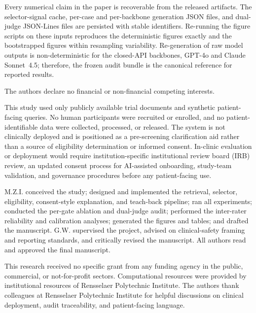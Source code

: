 \documentclass[pdflatex,Numbered]{sn-jnl}
\theoremstyle{plain}
\begin{document}
Every numerical claim in the paper is recoverable from the released artifacts. The selector-signal cache, per-case and per-backbone generation JSON files, and dual-judge JSON-Lines files are persisted with stable identifiers. Re-running the figure scripts on these inputs reproduces the deterministic figures exactly and the bootstrapped figures within resampling variability. Re-generation of raw model outputs is non-deterministic for the closed-API backbones, GPT-4o and Claude Sonnet~4.5; therefore, the frozen audit bundle is the canonical reference for reported results.

The authors declare no financial or non-financial competing interests.

This study used only publicly available trial documents and synthetic patient-facing queries. No human participants were recruited or enrolled, and no patient-identifiable data were collected, processed, or released. The system is not clinically deployed and is positioned as a pre-screening clarification aid rather than a source of eligibility determination or informed consent. In-clinic evaluation or deployment would require institution-specific institutional review board (IRB) review, an updated consent process for AI-assisted onboarding, study-team validation, and governance procedures before any patient-facing use.

M.Z.I. conceived the study; designed and implemented the retrieval, selector, eligibility, consent-style explanation, and teach-back pipeline; ran all experiments; conducted the per-gate ablation and dual-judge audit; performed the inter-rater reliability and calibration analyses; generated the figures and tables; and drafted the manuscript. G.W. supervised the project, advised on clinical-safety framing and reporting standards, and critically revised the manuscript. All authors read and approved the final manuscript.

This research received no specific grant from any funding agency in the public, commercial, or not-for-profit sectors. Computational resources were provided by institutional resources of Rensselaer Polytechnic Institute. The authors thank colleagues at Rensselaer Polytechnic Institute for helpful discussions on clinical deployment, audit traceability, and patient-facing language.






\end{document}
